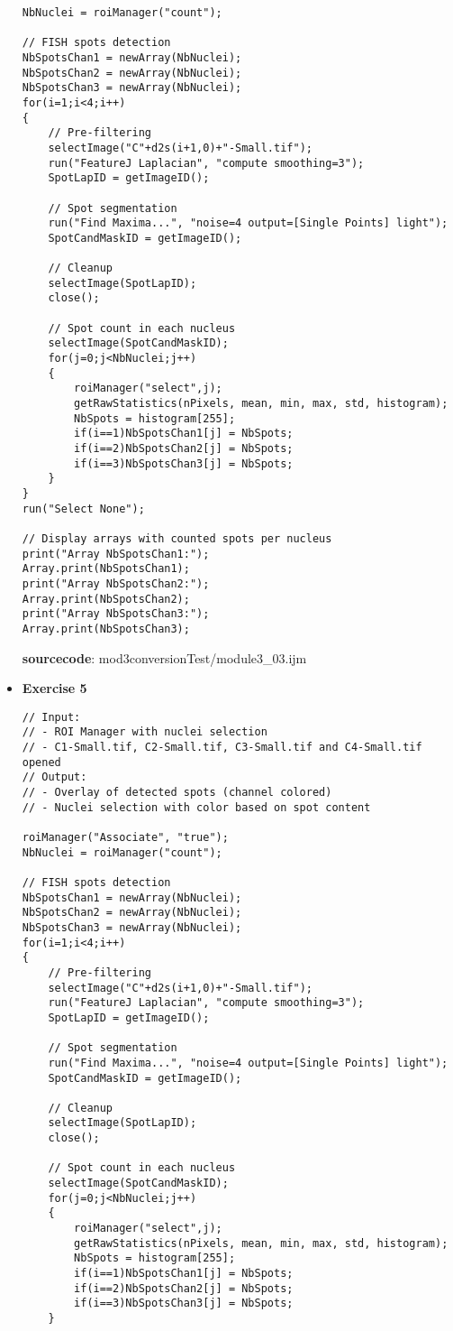 \begin{itemize}
\begin{lstlisting}
NbNuclei = roiManager("count");

// FISH spots detection
NbSpotsChan1 = newArray(NbNuclei);
NbSpotsChan2 = newArray(NbNuclei);
NbSpotsChan3 = newArray(NbNuclei);
for(i=1;i<4;i++)
{
	// Pre-filtering
	selectImage("C"+d2s(i+1,0)+"-Small.tif");
	run("FeatureJ Laplacian", "compute smoothing=3");
	SpotLapID = getImageID();
	
	// Spot segmentation
	run("Find Maxima...", "noise=4 output=[Single Points] light");
	SpotCandMaskID = getImageID();

	// Cleanup
	selectImage(SpotLapID);
	close();
	
	// Spot count in each nucleus
	selectImage(SpotCandMaskID);
	for(j=0;j<NbNuclei;j++)
	{ 	
		roiManager("select",j);
		getRawStatistics(nPixels, mean, min, max, std, histogram);
		NbSpots = histogram[255];
		if(i==1)NbSpotsChan1[j] = NbSpots;
		if(i==2)NbSpotsChan2[j] = NbSpots;
		if(i==3)NbSpotsChan3[j] = NbSpots;
	}	
}
run("Select None");

// Display arrays with counted spots per nucleus
print("Array NbSpotsChan1:");
Array.print(NbSpotsChan1);
print("Array NbSpotsChan2:");
Array.print(NbSpotsChan2);
print("Array NbSpotsChan3:");
Array.print(NbSpotsChan3);
\end{lstlisting}
\textbf{sourcecode}: mod3conversionTest/module3_03.ijm
\item \textbf{Exercise 5}

\begin{lstlisting}
// Input: 
// - ROI Manager with nuclei selection
// - C1-Small.tif, C2-Small.tif, C3-Small.tif and C4-Small.tif opened
// Output: 
// - Overlay of detected spots (channel colored)
// - Nuclei selection with color based on spot content

roiManager("Associate", "true");
NbNuclei = roiManager("count");

// FISH spots detection
NbSpotsChan1 = newArray(NbNuclei);
NbSpotsChan2 = newArray(NbNuclei);
NbSpotsChan3 = newArray(NbNuclei);
for(i=1;i<4;i++)
{	
	// Pre-filtering
	selectImage("C"+d2s(i+1,0)+"-Small.tif");
	run("FeatureJ Laplacian", "compute smoothing=3");
	SpotLapID = getImageID();
	
	// Spot segmentation
	run("Find Maxima...", "noise=4 output=[Single Points] light");
	SpotCandMaskID = getImageID();
	
	// Cleanup
	selectImage(SpotLapID);	
	close();

	// Spot count in each nucleus
	selectImage(SpotCandMaskID);
	for(j=0;j<NbNuclei;j++)
	{
		roiManager("select",j);
		getRawStatistics(nPixels, mean, min, max, std, histogram);
		NbSpots = histogram[255];
		if(i==1)NbSpotsChan1[j] = NbSpots;
		if(i==2)NbSpotsChan2[j] = NbSpots;
		if(i==3)NbSpotsChan3[j] = NbSpots;
	}
		

\end{lstlisting}
\end{itemize}
